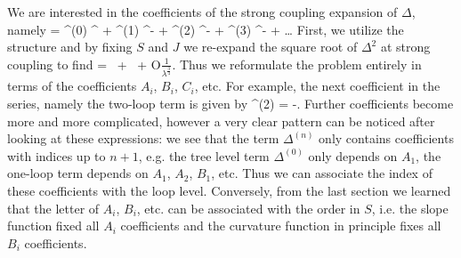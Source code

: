 We are interested in the coefficients of the strong coupling expansion of $\Delta$, namely
\beq
	\Delta = \Delta^{(0)} \lambda^ + \Delta^{(1)} \lambda^{-}  + \Delta^{(2)} \lambda^{-} + \Delta^{(3)} \lambda^{-} + \dots
\eeq
First, we utilize the structure  and by fixing $S$ and $J$ we re-expand the square root of $\Delta^2$ at strong coupling to find
\beq
	\label{eq:delta_abc}
	\Delta =  \, \sqrt[4]{\lambda}  +  \,  + {\cal O}\(\frac{1}{\lambda^\frac{3}{4}}\).
\eeq
Thus we reformulate the problem entirely in terms of the coefficients $A_i$, $B_i$, $C_i$, etc. For example, the next coefficient in the series, namely the two-loop term is given by
\beq
	\label{eq:delta_2loops_abc}
	\Delta^{(2)} = -.
\eeq
Further coefficients become more and more complicated, however a very clear pattern can be noticed after looking at these expressions: we see that the term $\Delta^{(n)}$ only contains coefficients with indices up to $n+1$, e.g. the tree level term $\Delta^{(0)}$  only depends on $A_1$, the one-loop term depends on $A_1$, $A_2$, $B_1$, etc. Thus we can associate the index of these coefficients with the loop level. Conversely, from the last section we learned that the letter of $A_i$, $B_i$, etc. can be associated with the order in $S$, i.e. the slope function fixed all $A_i$ coefficients and the curvature function in principle fixes all $B_i$ coefficients.

